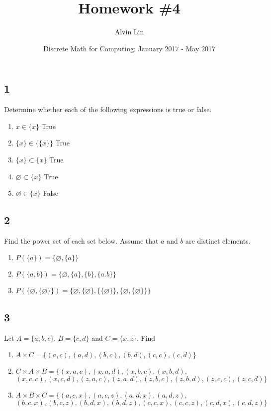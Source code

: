 \documentclass[letterpaper, 12pt]{math}
\title{Homework \#4}
\author{Alvin Lin}
\date{Discrete Math for Computing: January 2017 - May 2017}
\begin{document}
\maketitle

\subsection*{1}
Determine whether each of the following expressions is true or false.
\renewcommand{\labelenumi}{(\alph{enumi})}
\begin{enumerate}
  \item \( x \in \{x\} \) True
  \item \( \{x\} \in \{\{x\}\} \) True
  \item \( \{x\} \subset \{x\} \) True
  \item \( \varnothing \subset \{x\} \) True
  \item \( \varnothing \in \{x\} \) False
\end{enumerate}

\subsection*{2}
Find the power set of each set below. Assume that \( a \) and \( b \) are
distinct elements.
\begin{enumerate}
  \item \( P(\{a\}) = \{\varnothing,\{a\}\} \)
  \item \( P(\{a,b\}) = \{\varnothing,\{a\},\{b\},\{a.b\}\} \)
  \item \( P(\{\varnothing,\{\varnothing\}\}) = \{\varnothing,\{\varnothing\},
      \{\{\varnothing\}\},\{\varnothing,\{\varnothing\}\}\} \)
\end{enumerate}

\subsection*{3}
Let \( A = \{a,b,c\} \), \( B = \{c,d\} \) and \( C = \{x,z\} \). Find
\begin{enumerate}
  \item \( A\times C = \{(a,c),(a,d),(b,c),(b,d),(c,c),(c,d)\} \)
  \item \( C\times A\times B = \{(x,a,c),(x,a,d),(x,b,c),(x,b,d), \) \\
    \( (x,c,c),(x,c,d),(z,a,c),(z,a,d),(z,b,c),(z,b,d),(z,c,c),(z,c,d)\} \)
  \item \( A\times B\times C = \{(a,c,x),(a,c,z),(a,d,x),(a,d,z), \) \\
    \( (b,c,x),(b,c,z),(b,d,x),(b,d,z),(c,c,x),(c,c,z),(c,d,x),(c,d,z) \} \)
\end{enumerate}
\end{document}
